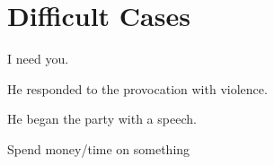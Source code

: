 \documentclass[a4paper]{article}
\begin{document}
\section{Difficult Cases}

I need you.

He responded to the provocation with violence.

He began the party with a speech.

Spend money/time on something



\end{document}
